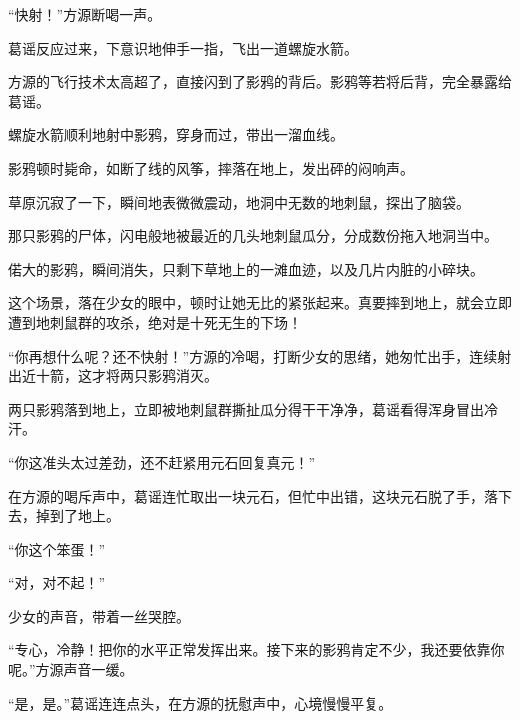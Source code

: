 \begin{this_body}
“快射！”方源断喝一声。

葛谣反应过来，下意识地伸手一指，飞出一道螺旋水箭。

方源的飞行技术太高超了，直接闪到了影鸦的背后。影鸦等若将后背，完全暴露给葛谣。

螺旋水箭顺利地射中影鸦，穿身而过，带出一溜血线。

影鸦顿时毙命，如断了线的风筝，摔落在地上，发出砰的闷响声。

草原沉寂了一下，瞬间地表微微震动，地洞中无数的地刺鼠，探出了脑袋。

那只影鸦的尸体，闪电般地被最近的几头地刺鼠瓜分，分成数份拖入地洞当中。

偌大的影鸦，瞬间消失，只剩下草地上的一滩血迹，以及几片内脏的小碎块。

这个场景，落在少女的眼中，顿时让她无比的紧张起来。真要摔到地上，就会立即遭到地刺鼠群的攻杀，绝对是十死无生的下场！

“你再想什么呢？还不快射！”方源的冷喝，打断少女的思绪，她匆忙出手，连续射出近十箭，这才将两只影鸦消灭。

两只影鸦落到地上，立即被地刺鼠群撕扯瓜分得干干净净，葛谣看得浑身冒出冷汗。

“你这准头太过差劲，还不赶紧用元石回复真元！”

在方源的喝斥声中，葛谣连忙取出一块元石，但忙中出错，这块元石脱了手，落下去，掉到了地上。

“你这个笨蛋！”

“对，对不起！”

少女的声音，带着一丝哭腔。

“专心，冷静！把你的水平正常发挥出来。接下来的影鸦肯定不少，我还要依靠你呢。”方源声音一缓。

“是，是。”葛谣连连点头，在方源的抚慰声中，心境慢慢平复。

\end{this_body}

